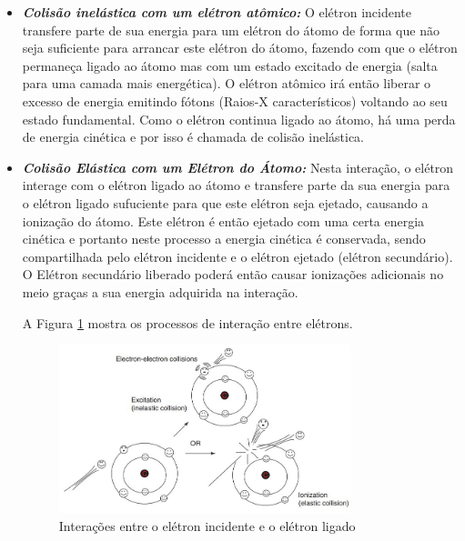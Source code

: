 \documentclass[11pt,a4paper]{article}
\begin{document}
            \begin{itemize}
                \item \textbf{\textit{\textcolor{CarnationPink}{Colisão inelástica com um elétron atômico}:}} O elétron incidente transfere parte de sua energia para um elétron do átomo de forma que não seja suficiente para arrancar este elétron do átomo, fazendo com que o elétron permaneça ligado ao átomo mas com um estado excitado de energia (salta para uma camada mais energética). O elétron atômico irá então liberar o excesso de energia emitindo fótons (Raios-X característicos) voltando ao seu estado fundamental. Como o elétron continua ligado ao átomo, há uma perda de energia cinética e por isso é chamada de colisão inelástica. 
                

                \item \textbf{\textit{\textcolor{CarnationPink}{Colisão Elástica com um Elétron do Átomo}:}} Nesta interação, o elétron interage com o elétron ligado ao átomo e transfere parte da sua energia para o elétron ligado sufuciente para que este elétron seja ejetado, causando a ionização do átomo. Este elétron é então ejetado com uma certa energia cinética e portanto neste processo a energia cinética é conservada, sendo compartilhada pelo elétron incidente e o elétron ejetado (elétron secundário). O Elétron secundário liberado poderá então causar ionizações adicionais no meio graças a sua energia adquirida na interação.
                
                A Figura \ref{fig:interacaoEletronComEletron} mostra os processos de interação entre elétrons. 

                \begin{figure}[h]
                    \centering
                    \includegraphics[width=0.8\textwidth]{Imagens/interacaoEletronComEletron.JPG}
                    \caption{Interações entre o elétron incidente e o elétron ligado}
                    \label{fig:interacaoEletronComEletron}                
                \end{figure}
                



\end{itemize}
\end{document}
